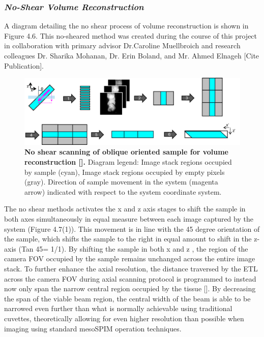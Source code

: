 \subsubsection{\textit{No-Shear Volume Reconstruction}}

A diagram detailing the no shear process of volume reconstruction is shown in Figure 4.6. This no-sheared method was created during the course of this project in collaboration with primary advisor Dr.Caroline Muellbroich and research colleagues Dr. Sharika Mohanan, Dr. Erin Boland, and Mr. Ahmed Elnageh [Cite Publication]. 

\begin{figure}[H]
    \centering
    \includegraphics[width=1\linewidth]{Figures/noshear.png}
    \medskip
    \caption{\textbf{No shear scanning of oblique oriented sample for volume reconstruction [].} Diagram legend: Image stack regions occupied by sample (cyan), Image stack regions occupied by empty pixels (gray). Direction of sample movement in the system (magenta arrow) indicated with respect to the system coordinate system.}
    \label{fig:enter-label}
\end{figure}

 The no shear methods activates the x and z axis stages to shift the sample in both axes simultaneously in equal measure between each image captured by the system (Figure 4.7(1)). This movement is in line with the 45 degree orientation of the sample, which shifts the sample to the right in equal amount to shift in the z-axis (Tan 45\degree = 1/1). By shifting the sample in both x and z , the region of the camera FOV occupied by the sample remains unchanged across the entire image stack. To further enhance the axial resolution, the distance traversed by the ETL across the camera FOV during axial scanning protocol is programmed to instead now only span the narrow central region occupied by the tissue []. By decreasing the span of the viable beam region, the central width of the beam is able to be narrowed even further than what is normally achievable using traditional cuvettes, theoretically allowing for even higher resolution than possible when imaging using standard mesoSPIM operation techniques.
 
